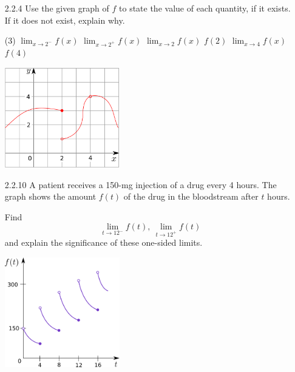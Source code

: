 \documentclass{article}
\begin{document}
\begin{enumerate}
    \item[2.2.4]
        Use the given graph of $f$ to state the value of each quantity, if it exists. If it does not exist, explain why.

        \begin{tasks}(3)
            \task
                $\displaystyle \lim_{x \to 2^{-}} f(x) $
            \task
                $\displaystyle \lim_{x \to 2^{+}} f(x) $
            \task
                $\displaystyle \lim_{x \to 2} f(x) $
            \task
                $ f(2) $
            \task
                $\displaystyle \lim_{x \to 4} f(x) $
            \task
                $ f(4) $
        \end{tasks}

        \vspace{0.5cm}

        \begin{center}
            \includegraphics[width=5cm]{./png/2.2.4.png}
        \end{center}

    \vspace{3cm}

    \item[2.2.10]
        A patient receives a 150-mg injection of a drug every 4 hours.
        The graph shows the amount $f(t)$ of the drug in the bloodstream after $t$ hours.

        Find
        \[
            \lim_{t \to 12^{-}} f(t),\ \lim_{t \to 12^{+}} f(t)
        \]
        and explain the significance of these one-sided limits.

        \begin{center}
            \includegraphics[width=5cm]{./png/2.2.10.png}
        \end{center}


\end{enumerate}
\end{document}
